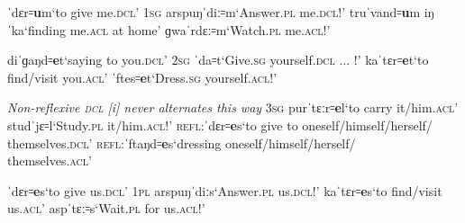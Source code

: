 \documentclass[output=paper,colorlinks,citecolor=brown]{langscibook}
\begin{document}
\begin{exe}
		\ex\label{objectpostverbal}
			\begin{xlist}
				\ex 
                        \begin{xlisti}
                           \ex ˈdɛr꞊\textbf{u}m\tab `to give me.\textsc{dcl}'  \tab  \hspace{5mm} 1\textsc{sg}
                           \ex arspuŋˈdiː꞊m\tab `Answer.\textsc{pl} me.\textsc{dcl}!'
                           \ex truˈvand꞊\textbf{u}m iŋ ˈka\tab `finding me.\textsc{acl} at home'
                           \ex ɡwaˈrdɛː꞊m\tab `Watch.\textsc{pl} me.\textsc{acl}!'
                        \end{xlisti}

                    \ex  \begin{xlisti}
                           \ex diˈɡaŋd꞊\textbf{e}t\tab  `saying to you.\textsc{dcl}'\tab \hspace{5mm} 2\textsc{sg}
                           \ex ˈda꞊t\tab `Give.\textsc{sg} yourself.\textsc{dcl} ... !'
                           \ex kaˈtɛr꞊\textbf{e}t\tab `to find/visit you.\textsc{acl}'
                           \ex ˈftes꞊\textbf{e}t\tab `Dress.\textsc{sg} yourself.\textsc{acl}!'
                        \end{xlisti}

                    \ex \begin{xlisti}
                        \ex \emph{Non-reflexive \textsc{dcl} [i] never alternates this way}\tab  \hspace{5mm} 3\textsc{sg}
                        \ex purˈtɛːr꞊\textbf{e}l\tab `to carry it/him.\textsc{acl}'
                        \ex studˈjɛ꞊l\tab `Study.\textsc{pl} it/him.\textsc{acl}!'
                        \ex \textsc{refl}:ˈdɛr꞊\textbf{e}s\tab `to give to oneself/himself/herself/ \\themselves.\textsc{dcl}'
                        \ex \textsc{refl}:ˈftaŋd꞊\textbf{e}s\tab `dressing oneself/himself/herself/ \\ themselves.\textsc{acl}'
                    \end{xlisti}
                    
                    \ex \begin{xlisti}
                        \ex ˈdɛr꞊\textbf{e}s\tab `to give us.\textsc{dcl}'\tab \hspace{5mm} 1\textsc{pl}
                        \ex arspuŋˈdiːs\tab `Answer.\textsc{pl} us.\textsc{dcl}!'
                        \ex kaˈtɛr꞊\textbf{e}s\tab `to find/visit us.\textsc{acl}'
                        \ex aspˈtɛː꞊s\tab `Wait.\textsc{pl} for us.\textsc{acl}!'
                    \end{xlisti}
                    

\end{xlist}
\end{exe}
\end{document}
